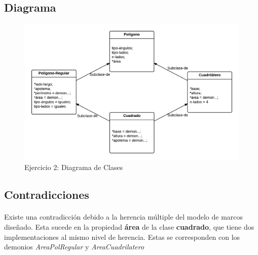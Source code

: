 \documentclass[10pt, a4paper,spanish]{article}
\begin{document}
			\begin{figure}[H]
				\centering
        
			\end{figure}


			\begin{figure}[H]
				\centering
        
			\end{figure}


			\begin{figure}[H]
				\centering
        
			\end{figure}


			\begin{figure}[H]
				\centering
        
			\end{figure}

    \subsection{Diagrama}


			\begin{figure}[H]
				\begin{center}
					\includegraphics[width=\textwidth]{exercise-2-diagram}
					\caption{Ejercicio 2: Diagrama de Clases}
					\label{image:diagram-2}
				\end{center}
			\end{figure}

    \subsection{Contradicciones}

      \paragraph{}
      Existe una contradicción debido a la herencia múltiple del modelo de marcos diseñado. Esta sucede en la propiedad \textbf{área} de la clase \textbf{cuadrado}, que tiene dos implementaciones al mismo nivel de herencia. Estas se corresponden con los demonios \emph{AreaPolRegular} y \emph{AreaCuadrilatero}
\end{document}
